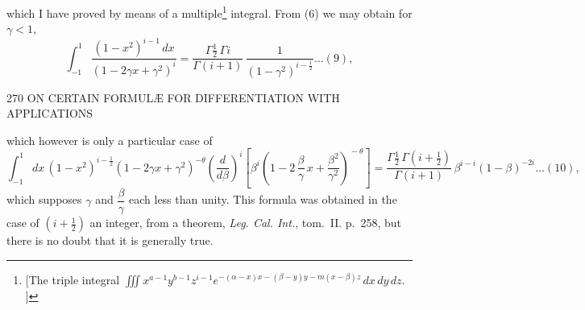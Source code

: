 \documentclass[11pt]{article}
\begin{document}
which I have proved by means of a multiple\footnote{[The triple integral $\iiint x^{a-1}y^{b-1}z^{i-1}e^{-(\alpha-x)x-(\beta-y)y-m(x-\beta)z}\,dx\,dy\,dz.$]} integral. From (6) we may obtain for $\gamma < 1$,
\[
  \int_{-1}^{1}\!\frac{(1-x^{2})^{i-1}\,dx}{(1-2\gamma x + \gamma^{2})^{i}}
     = \frac{\Gamma\tfrac{1}{2}\,\Gamma i}{\Gamma(i+1)}\,\frac{1}{(1-\gamma^{2})^{i-\tfrac{1}{2}}}\dots(9),
\]

\vspace{2em}

\begin{center}\small 270 \quad ON CERTAIN FORMUL\AE{} FOR DIFFERENTIATION WITH APPLICATIONS \quad [41]\end{center}

\noindent which however is only a particular case of
\[
  \int_{-1}^{1}\!dx\,(1-x^{2})^{i-\tfrac{1}{2}}(1-2\gamma x + \gamma^{2})^{-\theta}\!\left(\frac{d}{d\beta}\right)^{\!i}\!\!\left[\beta^{i}\!\left(1 - 2\,\frac{\beta}{\gamma}\,x + \frac{\beta^{2}}{\gamma^{2}}\right)^{\!-\theta}\right]
     = \frac{\Gamma\tfrac{1}{2}\,\Gamma(i+\tfrac{1}{2})}{\Gamma(i+1)}\,\beta^{i-i}(1-\beta)^{-2i}\dots(10),
\]
which supposes $\gamma$ and $\dfrac{\beta}{\gamma}$ each less than unity. This formula was obtained in the case of $(i+\tfrac{1}{2})$ an integer, from a theorem, \textit{Leg. Cal. Int.}, tom.~II. p.~258, but there is no doubt that it is generally true.
\end{document}
